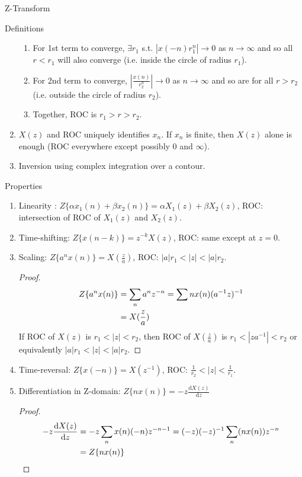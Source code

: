 \documentclass{article}
\begin{document}
\begin{section}{Z-Transform}
\begin{subsection}{Definitions}
\begin{enumerate}
  \begin{enumerate}
  \item For 1st term to converge, $\exists r_{1}$ s.t. $|x(-n) r_{1}^{n}|
   \to 0$ as $n \to \infty$ and so all $r < r_{1}$ will also converge
   (i.e. inside the circle of radius $r_{1}$).
  \item For 2nd term to converge, $\left|\frac{x(n)}{r_{2}^{n}}\right| \to 0$
   as $n \to \infty$ and so are for all $r > r_{2}$ (i.e. outside the circle
   of radius $r_{2}$).
  \item Together, ROC is $r_{1} > r > r_{2}$.
  \end{enumerate}
\item $X(z)$ and ROC uniquely identifies $x_{n}$. If $x_{n}$ is finite,
then $X(z)$ alone is enough (ROC everywhere except possibly 0 and $\infty$).
\item Inversion using complex integration over a contour.
\end{enumerate}
\end{subsection}

\begin{subsection}{Properties}
\begin{enumerate}
\item Linearity : $Z\{\alpha x_{1}(n) + \beta x_{2}(n)\} = 
  \alpha X_{1}(z) + \beta X_{2}(z)$, ROC: intersection of ROC of
  $X_{1}(z)$ and $X_{2}(z)$.
\item Time-shifting: $Z\{x(n-k)\} = z^{-k} X(z)$, ROC: same except at $z=0$.
\item Scaling: $Z\{a^{n} x(n)\} = X(\frac{z}{a})$, ROC: 
  $|a|r_{1} < |z| < |a|r_{2}$.
  \begin{proof}
  \begin{align}
  Z\{a^{n}x(n)\} &= \sum_{n} a^{n}z^{-n} = \sum{n} x(n) (a^{-1}z)^{-1}\notag\\
    &= X(\frac{z}{a}) \notag
  \end{align}
  \noindent If ROC of $X(z)$ is $r_{1} < |z| < r_{2}$, then ROC of 
  $X(\frac{z}{a})$ is $r_{1} < |za^{-1}| < r_{2}$ or equivalently 
  $|a|r_{1} < |z| < |a|r_{2}$.
  \end{proof}
\item Time-reversal: $Z\{x(-n)\} = X(z^{-1})$, ROC: $\frac{1}{r_{2}} < |z| <
  \frac{1}{r_{1}}$.
\item Differentiation in Z-domain: $Z\{n x(n)\} = -z 
  \frac{\text{d} X(z)}{\text{d}z}$
  \begin{proof}
  \begin{align}
  -z \frac{\text{d}X(z)}{\text{d}z} &= -z \sum_{n} x(n) (-n)z^{-n-1} 
    = (-z) (-z)^{-1} \sum_{n} (n x(n)) z^{-n} \notag\\
    &= Z\{n x(n)\} \notag
  \end{align}
  

\end{proof}
\end{enumerate}
\end{subsection}
\end{section}
\end{document}

